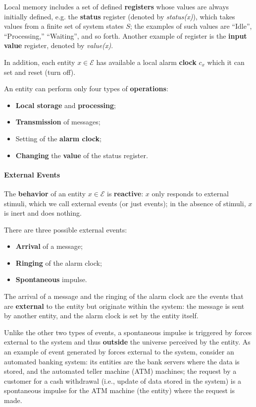 Local memory includes a set of defined \textbf{registers} whose values are always initially defined, e.g. the \textbf{status} register (denoted by \textit{status(x)}), which takes values from a finite set of system states $S$; the examples of such values are “Idle”, “Processing,” “Waiting”, and so forth. Another example of register is the \textbf{input value} register, denoted by \textit{value(x)}.

In addition, each entity $x \in \mathcal{E}$ has available a local alarm \textbf{clock} $c_x$ which it can set and reset (turn off). 

An entity can perform only four types of \textbf{operations}:
\begin{itemize}
    \item \textbf{Local storage} and \textbf{processing};
    \item \textbf{Transmission} of messages;
    \item Setting of the \textbf{alarm clock};
    \item \textbf{Changing} the \textbf{value} of the status register.
\end{itemize}

\paragraph{External Events} The \textbf{behavior} of an entity $x \in \mathcal{E}$ is \textbf{reactive}: $x$ only responds to external stimuli, which we call external events (or just events); in the absence of stimuli, $x$ is inert and does nothing. 

There are three possible external events:
\begin{itemize}
    \item \textbf{Arrival} of a message;
    \item \textbf{Ringing} of the alarm clock;
    \item \textbf{Spontaneous} impulse.
\end{itemize}

The arrival of a message and the ringing of the alarm clock are the events that are \textbf{external} to the entity but originate within the system: the message is sent by another entity, and the alarm clock is set by the entity itself. 

Unlike the other two types of events, a spontaneous impulse is triggered by forces external to the system and thus \textbf{outside} the universe perceived by the entity. As an example of event generated by forces external to the system, consider an automated banking system: its entities are the bank servers where the data is stored, and the automated teller machine (ATM) machines; the request by a customer for a cash withdrawal (i.e., update of data stored in the system) is a spontaneous impulse for the ATM machine (the entity) where the request is made. 

